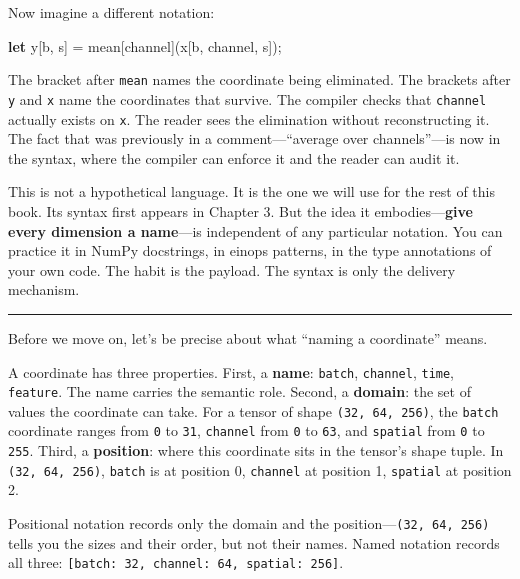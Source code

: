 \documentclass[11pt,]{article}
\newenvironment{Shaded}{}{}
\newcommand{\KeywordTok}[1]{\textcolor[rgb]{0.00,0.44,0.13}{\textbf{#1}}}
\newcommand{\NormalTok}[1]{#1}
\newcommand{\OperatorTok}[1]{\textcolor[rgb]{0.40,0.40,0.40}{#1}}
\begin{document}
Now imagine a different notation:

\begin{Shaded}
\begin{Highlighting}[]
\KeywordTok{let}\NormalTok{ y}\OperatorTok{[}\NormalTok{b, s}\OperatorTok{]}\NormalTok{ = mean}\OperatorTok{[}\NormalTok{channel}\OperatorTok{]}\NormalTok{(x}\OperatorTok{[}\NormalTok{b, channel, s}\OperatorTok{]}\NormalTok{);}
\end{Highlighting}
\end{Shaded}

The bracket after \texttt{mean} names the coordinate being eliminated.
The brackets after \texttt{y} and \texttt{x} name the coordinates that
survive. The compiler checks that \texttt{channel} actually exists on
\texttt{x}. The reader sees the elimination without reconstructing it.
The fact that was previously in a comment---``average over
channels''---is now in the syntax, where the compiler can enforce it and
the reader can audit it.

This is not a hypothetical language. It is the one we will use for the
rest of this book. Its syntax first appears in Chapter 3. But the idea
it embodies---\textbf{give every dimension a name}---is independent of
any particular notation. You can practice it in NumPy docstrings, in
einops patterns, in the type annotations of your own code. The habit is
the payload. The syntax is only the delivery mechanism.

\begin{center}\rule{0.5\linewidth}{0.4pt}\end{center}

Before we move on, let's be precise about what ``naming a coordinate''
means.

A coordinate has three properties. First, a \textbf{name}:
\texttt{batch}, \texttt{channel}, \texttt{time}, \texttt{feature}. The
name carries the semantic role. Second, a \textbf{domain}: the set of
values the coordinate can take. For a tensor of shape
\texttt{(32,\ 64,\ 256)}, the \texttt{batch} coordinate ranges from
\texttt{0} to \texttt{31}, \texttt{channel} from \texttt{0} to
\texttt{63}, and \texttt{spatial} from \texttt{0} to \texttt{255}.
Third, a \textbf{position}: where this coordinate sits in the tensor's
shape tuple. In \texttt{(32,\ 64,\ 256)}, \texttt{batch} is at position
0, \texttt{channel} at position 1, \texttt{spatial} at position 2.

Positional notation records only the domain and the
position---\texttt{(32,\ 64,\ 256)} tells you the sizes and their order,
but not their names. Named notation records all three:
\texttt{{[}batch:\ 32,\ channel:\ 64,\ spatial:\ 256{]}}.
\end{document}
